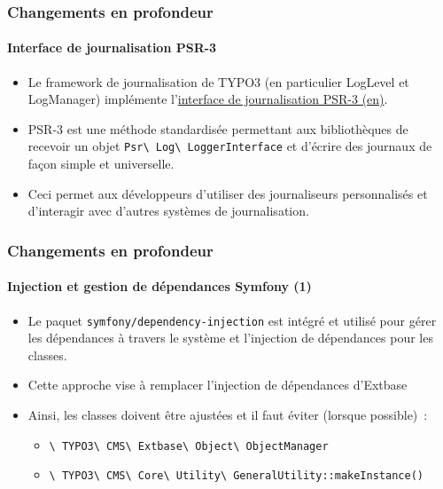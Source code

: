 
\begin{frame}[fragile]
	\frametitle{Changements en profondeur}
	\framesubtitle{Interface de journalisation PSR-3}

	\begin{itemize}
		\item Le framework de journalisation de TYPO3 (en particulier LogLevel et LogManager)
			implémente l'\href{https://www.php-fig.org/psr/psr-3/}{interface de journalisation PSR-3 (en)}.

		\item PSR-3 est une méthode standardisée permettant aux bibliothèques de recevoir un objet
			\texttt{Psr\textbackslash
				Log\textbackslash
				LoggerInterface} et d'écrire des journaux de façon simple et universelle.

			\item Ceci permet aux développeurs d'utiliser des journaliseurs personnalisés et d'interagir
				avec d'autres systèmes de journalisation.

	\end{itemize}

\end{frame}


\begin{frame}[fragile]
	\frametitle{Changements en profondeur}
	\framesubtitle{Injection et gestion de dépendances Symfony (1)}

	\begin{itemize}
		\item Le paquet \texttt{symfony/dependency-injection} est intégré et utilisé pour gérer
			les dépendances à travers le système et l'injection de dépendances pour les classes.

		\item Cette approche vise à remplacer l'injection de dépendances d'Extbase

		\item Ainsi, les classes doivent être ajustées et il faut éviter (lorsque possible)~:

			\begin{itemize}\small
				\item \texttt{\textbackslash
					TYPO3\textbackslash
					CMS\textbackslash
					Extbase\textbackslash
					Object\textbackslash
					ObjectManager}
				\item \texttt{\textbackslash
					TYPO3\textbackslash
					CMS\textbackslash
					Core\textbackslash
					Utility\textbackslash
					GeneralUtility::makeInstance()}
			\end{itemize}\normalsize

	\end{itemize}

\end{frame}


